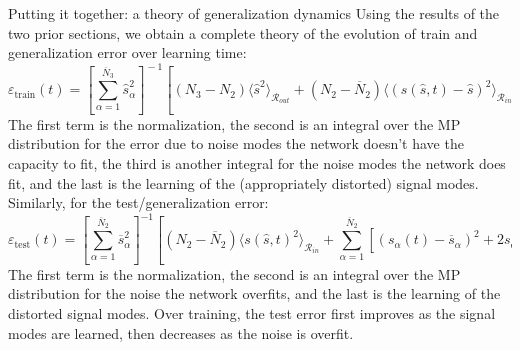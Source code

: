 \documentclass[final]{beamer}
\newcommand{\trainerr}{\mathcal{\varepsilon}_\text{train}}
\newcommand{\generr}{\mathcal{\varepsilon}_\text{test}}
\begin{document}
\begin{frame}[t]{}
\begin{columns}
\begin{column}[t]{0.248\textwidth}
\begin{block}{\large Putting it together: a theory of generalization dynamics}
\vspace{-0.25em}
Using the results of the two prior sections, we obtain a complete theory of the evolution of train and generalization error over learning time:
{\small
\begin{equation}
\trainerr(t) = 
\left[\sum_{\alpha=1}^{\overline{N}_3} \hat{s}_{\alpha}^2\right]^{\!-1}\!\!
\left[
(N_3 - N_2) \langle \hat s^2 \rangle_{\mathcal{R}_{out}} \!+ \! (N_2 - \overline{N}_2) \langle (s(\hat{s},t) -\hat{s})^2 \rangle_{\mathcal{R}_{in}} +  
\sum_{\alpha=1}^{\overline{N}_2} 
    \left[
       s_\alpha(t) -  
       \hat{s}_{\alpha} \right]^2
\right]
\label{eq:trainerrth}
\end{equation}
}%
The first term is the normalization, the second is an integral over the MP distribution for the error due to noise modes the network doesn't have the capacity to fit, the third is another integral for the noise modes the network does fit, and the last is the learning of the (appropriately distorted) signal modes. Similarly, for the test/generalization error:
{\small
\begin{equation}
\generr(t) = 
\left[\sum_{\alpha=1}^{\overline{N}_2} \overline{s}_{\alpha}^2\right]^{-1}
\left[
(N_2 - \overline{N}_2) \langle s(\hat{s},t)^2 \rangle_{\mathcal{R}_{in}} + 
\sum_{\alpha=1}^{\overline{N}_2} 
    \left[
       (s_\alpha(t) - \overline{s}_{\alpha})^2  
       + 2 s_\alpha(t) \overline{s}_{\alpha}(1-\mathcal{O}(\overline{s}_\alpha))
       \right]      
\right]
\label{eq:generrth}
\end{equation}
}%
The first term is the normalization, the second is an integral over the MP distribution for the noise the network overfits, and the last is the learning of the distorted signal modes. Over training, the test error first improves as the signal modes are learned, then decreases as the noise is overfit. 
\end{block}


\end{column}
\end{columns}
\end{frame}
\end{document}
